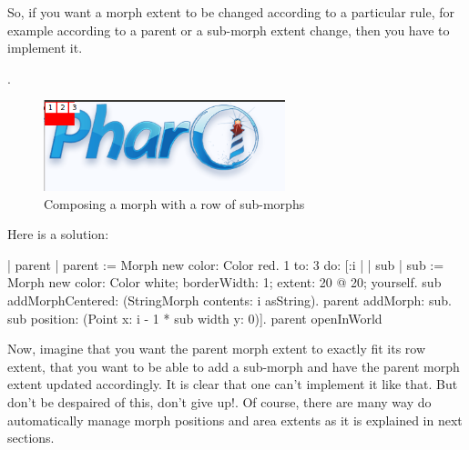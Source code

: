 \documentclass[a4paper,10pt,twoside]{book}
\begin{document}
So, if you want a morph extent to be changed according to a particular rule, for example according to a parent or a sub-morph extent change, then you have to implement it.

.

\begin{figure}[htbp]
\begin{center}
	\includegraphics[width=7cm]{composingMorph3}
	\caption{Composing a morph with a row of sub-morphs}
\end{center}
\end{figure}
Here is a solution:
\begin{code}
| parent |
parent := Morph new color: Color red.
1 to: 3
 do: [:i | 	| sub |
	sub := Morph new color: Color white; borderWidth: 1; extent: 20 @ 20; yourself.
	sub addMorphCentered: (StringMorph contents: i asString).
	parent addMorph: sub.
	sub position: (Point x: i - 1 * sub width y: 0)].
parent openInWorld
\end{code}


Now, imagine that you want the parent morph extent to exactly fit its row extent, that you want to be able to add a sub-morph and have the parent morph extent updated accordingly. It is clear that one can't implement it like that. But don't be despaired of this, don't give up!.  Of course, there are many way do automatically manage morph positions and area extents as it is explained in next sections.
\end{document}
